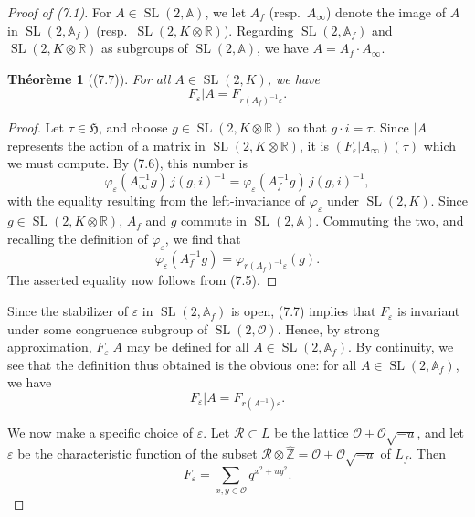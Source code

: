 \documentclass[12pt,a4paper]{article}
\theoremstyle{plain}
\newtheorem{theorem}{Th\'{e}or\`{e}me}[section]
\theoremstyle{definition}
\theoremstyle{remark}
\DeclareMathOperator{\SL}{SL}
\begin{document}
\begin{proof}[Proof of (7.1)]
For $A \in \SL(2, \mathbb{A})$, we let $A_f$ (resp.~$A_\infty$) denote the image of $A$ in $\SL(2, \mathbb{A}_f)$ (resp.~$\SL(2, K \otimes \mathbb{R})$). Regarding $\SL(2, \mathbb{A}_f)$ and $\SL(2, K \otimes \mathbb{R})$ as subgroups of $\SL(2, \mathbb{A})$, we have $A = A_f \cdot A_\infty$.

\begin{theorem}[(7.7)]\label{thm:7.7}
For all $A \in \SL(2, K)$, we have
\[
F_\varepsilon|A = F_{r(A_f)^{-1}\varepsilon}.
\]
\end{theorem}

\begin{proof}
Let $\tau \in \mathfrak{H}$, and choose $g \in \SL(2, K \otimes \mathbb{R})$ so that $g \cdot i = \tau$. Since $|A$ represents the action of a matrix in $\SL(2, K \otimes \mathbb{R})$, it is $(F_\varepsilon|A_\infty)(\tau)$ which we must compute. By (7.6), this number is
\[
\varphi_\varepsilon(A_\infty^{-1} g) \, j(g, i)^{-1} = \varphi_\varepsilon(A_f^{-1} g) \, j(g, i)^{-1},
\]
with the equality resulting from the left-invariance of $\varphi_\varepsilon$ under $\SL(2,K)$. Since $g \in \SL(2, K \otimes \mathbb{R})$, $A_f$ and $g$ commute in $\SL(2, \mathbb{A})$. Commuting the two, and recalling the definition of $\varphi_\varepsilon$, we find that
\[
\varphi_\varepsilon(A_f^{-1} g) = \varphi_{r(A_f)^{-1}\varepsilon}(g).
\]
The asserted equality now follows from (7.5).
\end{proof}

Since the stabilizer of $\varepsilon$ in $\SL(2, \mathbb{A}_f)$ is open, (7.7) implies that $F_\varepsilon$ is invariant under some congruence subgroup of $\SL(2, \mathcal{O})$. Hence, by strong approximation, $F_\varepsilon|A$ may be defined for all $A \in \SL(2, \mathbb{A}_f)$. By continuity, we see that the definition thus obtained is the obvious one: for all $A \in \SL(2, \mathbb{A}_f)$, we have
\begin{equation}\label{eq:7.8}
F_\varepsilon|A = F_{r(A^{-1})\varepsilon}.
\end{equation}

We now make a specific choice of $\varepsilon$. Let $\mathscr{R} \subset L$ be the lattice $\mathcal{O} + \mathcal{O}\sqrt{-u}$, and let $\varepsilon$ be the characteristic function of the subset $\mathscr{R} \otimes \hat{\mathbb{Z}} = \mathcal{O} + \mathcal{O}\sqrt{-u}$ of $L_f$. Then
\[
F_\varepsilon = \sum_{x,y \in \mathcal{O}} q^{x^2 + u y^2}.
\]


\end{proof}
\end{document}
